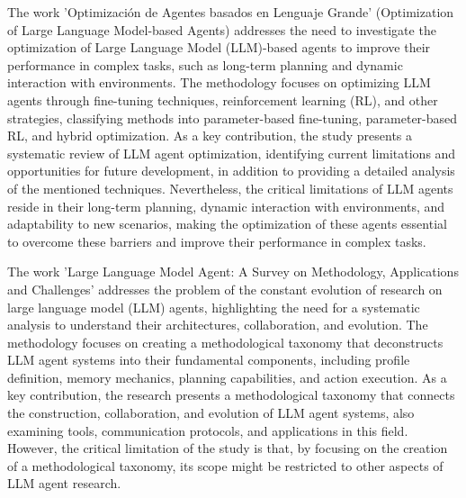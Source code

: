 \par\par
The work 'Optimización de Agentes basados en Lenguaje Grande' \cite{ref-3} (Optimization of Large Language Model-based Agents) addresses the need to investigate the optimization of Large Language Model (LLM)-based agents to improve their performance in complex tasks, such as long-term planning and dynamic interaction with environments. The methodology focuses on optimizing LLM agents through fine-tuning techniques, reinforcement learning (RL), and other strategies, classifying methods into parameter-based fine-tuning, parameter-based RL, and hybrid optimization. As a key contribution, the study presents a systematic review of LLM agent optimization, identifying current limitations and opportunities for future development, in addition to providing a detailed analysis of the mentioned techniques. Nevertheless, the critical limitations of LLM agents reside in their long-term planning, dynamic interaction with environments, and adaptability to new scenarios, making the optimization of these agents essential to overcome these barriers and improve their performance in complex tasks.

\par\par
The work 'Large Language Model Agent: A Survey on Methodology, Applications and Challenges' \cite{ref-4} addresses the problem of the constant evolution of research on large language model (LLM) agents, highlighting the need for a systematic analysis to understand their architectures, collaboration, and evolution. The methodology focuses on creating a methodological taxonomy that deconstructs LLM agent systems into their fundamental components, including profile definition, memory mechanics, planning capabilities, and action execution. As a key contribution, the research presents a methodological taxonomy that connects the construction, collaboration, and evolution of LLM agent systems, also examining tools, communication protocols, and applications in this field. However, the critical limitation of the study is that, by focusing on the creation of a methodological taxonomy, its scope might be restricted to other aspects of LLM agent research.

